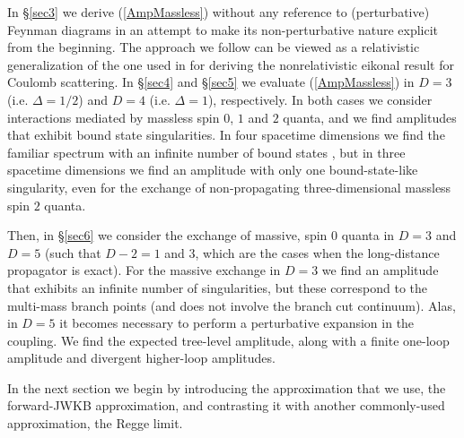 In \S\ref{sec3} we derive (\ref{AmpMassless}) without any reference to (perturbative) Feynman diagrams in an attempt to make its non-perturbative nature explicit from the beginning. The approach we follow can be viewed as a relativistic generalization of the one used in \cite{ZinnJustinBook} for deriving the nonrelativistic eikonal result for Coulomb scattering. In \S\ref{sec4} and \S\ref{sec5} we evaluate (\ref{AmpMassless}) in $D = 3$ (i.e. $\Delta = 1/2$) and $D = 4$ (i.e. $\Delta = 1$), respectively. In both cases we consider interactions mediated by massless spin $0$, $1$ and $2$ quanta, and we find amplitudes that exhibit bound state singularities. In four spacetime dimensions we find the familiar spectrum with an infinite number of bound states \cite{BIZJ,KabatOrtiz,Dittrich}, but in three spacetime dimensions we find an amplitude with only one bound-state-like singularity, even for the exchange of non-propagating three-dimensional massless spin $2$ quanta.

Then, in \S\ref{sec6} we consider the exchange of massive, spin $0$ quanta in $D = 3$ and $D = 5$ (such that $D - 2 = 1$ and $3$, which are the cases when the long-distance propagator is exact). For the massive exchange in $D = 3$ we find an amplitude that exhibits an infinite number of singularities, but these correspond to the multi-mass branch points (and does not involve the branch cut continuum). Alas, in $D = 5$ it becomes necessary to perform a perturbative expansion in the coupling. We find the expected tree-level amplitude, along with a finite one-loop amplitude and divergent higher-loop amplitudes.

In the next section we begin by introducing the approximation that we use, the forward-JWKB approximation, and contrasting it with another commonly-used approximation, the Regge limit.